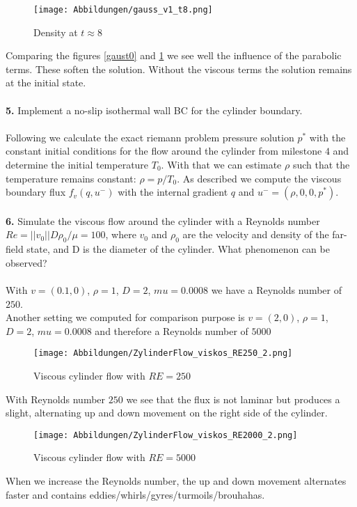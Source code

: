 \documentclass[11pt]{scrartcl}
\begin{document}
 \begin{figure}[H]
 	\centering
 	\texttt{[image: Abbildungen/gauss\_v1\_t8.png]}
 	\caption{Density at $t \approx 8$ }
 	\label{gaus_euler_t4}
 \end{figure}


Comparing the figures \ref{gaust0} and \ref{gaus_euler_t4} we see well the influence of the parabolic terms. These soften the solution. Without the viscous terms the solution remains at the initial state. \\ \ \\

\textbf{5.} Implement a no-slip isothermal wall BC for the cylinder boundary. \\ \ \\
Following \cite{BoundaryPaper} we calculate the exact riemann problem pressure solution $p^*$ with the constant initial conditions for the flow around the cylinder from milestone $4$ and determine the initial temperature $T_0$. With that we can estimate $\rho$ such that the temperature remains constant: $\rho = p/T_0$. As described we compute the viscous boundary flux $f_v(q, u^-)$ with the internal gradient $q$ and $u^- = (\rho, 0, 0, p^*)$. \\ \ \\

\textbf{6.} Simulate the viscous flow around the cylinder with a Reynolds number $Re = ||v_0||D\rho_0/\mu = 100$, where $v_0$ and $\rho_0$ are the velocity and density
of the far-field state, and D is the diameter of the cylinder. What
phenomenon can be observed? \\ \ \\
With $v=(0.1, 0)$, $\rho = 1$, $D=2$, $mu = 0.0008$ we have a Reynolds number of $250$. \\
Another setting we computed for comparison purpose is $v=(2, 0)$, $\rho = 1$, $D=2$, $mu = 0.0008$ and therefore a Reynolds number of $5000$

\begin{figure}[H]
\centering
\texttt{[image: Abbildungen/ZylinderFlow\_viskos\_RE250\_2.png]}
\caption{Viscous cylinder flow with $RE=250$}
\label{RE250}
\end{figure}
With Reynolds number $250$ we see that the flux is not laminar but produces a slight, alternating up and down movement on the right side of the cylinder.

\begin{figure}[H]
\centering
\texttt{[image: Abbildungen/ZylinderFlow\_viskos\_RE2000\_2.png]}
\caption{Viscous cylinder flow with $RE=5000$}
\label{RE5000}
\end{figure}
When we increase the Reynolds number, the up and down movement alternates faster and contains eddies/whirls/gyres/turmoils/brouhahas. \\
\end{document}
